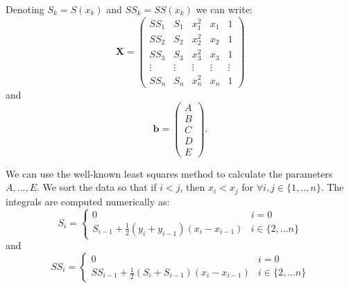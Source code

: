 Denoting $S_k=S(x_k)$ and $SS_k=SS(x_k)$ we can write:
\begin{equation}
	\boldsymbol{X} =
	\begin{pmatrix}
		SS_1 & S_1 & x_1^2 & x_1 & 1 \\
		SS_2 & S_2 & x_2^2 & x_2 & 1 \\
		SS_3 & S_3 & x_3^2 & x_3 & 1 \\
		\vdots & \vdots & \vdots & \vdots & \vdots \\
		SS_n & S_n & x_n^2 & x_n & 1  
	\end{pmatrix}
\end{equation}
and 
\begin{equation}
	\boldsymbol{b} =
	\begin{pmatrix}
		A \\
		B \\
		C \\
		D \\
		E  
	\end{pmatrix}.
\end{equation}

We can use the well-known least squares method to calculate the parameters $A,...,E$. We sort the data so that if $i<j$, then $x_i<x_j$ for $\forall i,j \in \{1,..,n\}$. The integrals are computed numerically as:
\begin{equation}
	S_i = \left\{
	\begin{array}{ll}
		0 & i=0 \\
		S_{i-1} + \frac{1}{2}(y_i+y_{i-1})(x_i-x_{i-1}) & i\in\{2,...n\}
	\end{array}
	\right.
\end{equation}
and
\begin{equation}
	SS_i = \left\{
	\begin{array}{ll}
		0 & i=0 \\
		SS_{i-1} + \frac{1}{2}(S_i+S_{i-1})(x_i-x_{i-1}) & i\in\{2,...n\}
	\end{array}
	\right.
\end{equation}


